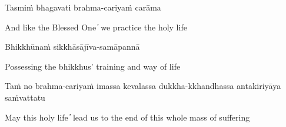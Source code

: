 Tasmiṁ bhagavati brahma-cariyaṁ carāma

\begin{cprenglish}
  And like the Blessed One  ̓  we practice the holy life
\end{cprenglish}

Bhikkhūnaṁ sikkhāsājīva-samāpannā

\begin{cprenglish}
  Possessing the bhikkhus’ training and way of life
\end{cprenglish}

Taṁ no brahma-cariyaṁ imassa kevalassa dukkha-kkhandhassa antakiriyāya saṁvattatu

\begin{cprenglish}
  May this holy life  ̓  lead us to the end of this whole mass of suffering
\end{cprenglish}

